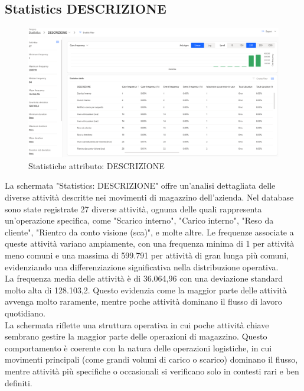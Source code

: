 \documentclass{article}
\begin{document}
\subsection{Statistics DESCRIZIONE}
\begin{figure}[H]
    \centering
    \includegraphics[width=\textwidth]{imgMicrosoft/DatiReali/StatisticsDESCRIZIONEDatiReali.png}
    \caption{Statistiche attributo: DESCRIZIONE}
    \label{fig:statistics-DESCRIZIONE}
\end{figure}
La schermata "Statistics: DESCRIZIONE" offre un'analisi dettagliata delle diverse attività descritte nei movimenti di magazzino dell'azienda.
Nel database sono state registrate 27 diverse attività, ognuna delle quali rappresenta un'operazione specifica, come "Scarico interno", "Carico interno", "Reso da cliente", "Rientro da conto visione (sca)", e molte altre. Le frequenze associate a queste attività variano ampiamente, con una frequenza minima di 1 per attività meno comuni e una massima di 599.791 per attività di gran lunga più comuni, evidenziando una differenziazione significativa nella distribuzione operativa.\\
La frequenza media delle attività è di 36.064,96 con una deviazione standard molto alta di 128.103,2. Questo evidenzia come la maggior parte delle attività avvenga molto raramente, mentre poche attività dominano il flusso di lavoro quotidiano.\\
La schermata riflette una struttura operativa in cui poche attività chiave sembrano gestire la maggior parte delle operazioni di magazzino. Questo comportamento è coerente con la natura delle operazioni logistiche, in cui movimenti principali (come grandi volumi di carico o scarico) dominano il flusso, mentre attività più specifiche o occasionali si verificano solo in contesti rari e ben definiti.\\
\end{document}
